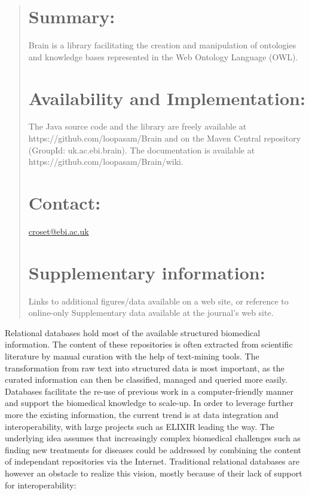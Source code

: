 \documentclass{bioinfo}
\begin{document}
\begin{abstract}

\section{Summary:}
Brain is a library facilitating the creation and manipulation of ontologies and knowledge bases represented in the
Web Ontology Language (OWL).

\section{Availability and Implementation:}
The Java source code and the library are freely available at https://github.com/loopasam/Brain
and on the Maven Central repository (GroupId: uk.ac.ebi.brain).
The documentation is available at https://github.com/loopasam/Brain/wiki.

\section{Contact:}
\href{croset@ebi.ac.uk}{croset@ebi.ac.uk}

\section{Supplementary information:}
Links to additional figures/data available on a web site, or 
reference to online-only Supplementary data available at the journal's web site.

\end{abstract}
Relational databases hold most of the available structured biomedical information. The content of these repositories is often
extracted from scientific literature by manual curation with the help of text-mining tools. The transformation from raw text into
structured data is most important, as the curated information can then be classified, managed and queried more easily. Databases facilitate
the re-use of previous work in a computer-friendly manner and support the biomedical knowledge to scale-up. In order to leverage further 
more the existing information, the current trend is at data integration and interoperability, with large projects such as ELIXIR leading the way.
The underlying idea assumes that increasingly complex biomedical challenges such as finding new treatments for diseases could be addressed 
by combining the content of independant repositories via the Internet. 
Traditional relational databases are however an obstacle to realize this vision, mostly because of their lack of support for interoperability:
\end{document}
